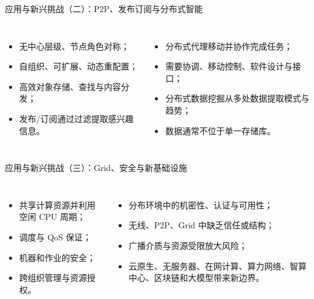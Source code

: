 \documentclass[UTF8,fontset=none,aspectratio=169,10pt]{beamer}
\begin{document}
\begin{frame}{应用与新兴挑战（二）：P2P、发布订阅与分布式智能}
\begin{columns}[T,onlytextwidth]
\begin{itemize}
  \item 无中心层级、节点角色对称；
  \item 自组织、可扩展、动态重配置；
  \item 高效对象存储、查找与内容分发；
  \item 发布/订阅通过过滤提取感兴趣信息。
\end{itemize}
\begin{itemize}
  \item 分布式代理移动并协作完成任务；
  \item 需要协调、移动控制、软件设计与接口；
  \item 分布式数据挖掘从多处数据提取模式与趋势；
  \item 数据通常不位于单一存储库。
\end{itemize}
\end{columns}
\end{frame}

\begin{frame}{应用与新兴挑战（三）：Grid、安全与新基础设施}
\begin{columns}[T,onlytextwidth]
\begin{itemize}
  \item 共享计算资源并利用空闲 CPU 周期；
  \item 调度与 QoS 保证；
  \item 机器和作业的安全；
  \item 跨组织管理与资源授权。
\end{itemize}
\begin{itemize}
  \item 分布环境中的机密性、认证与可用性；
  \item 无线、P2P、Grid 中缺乏信任或结构；
  \item 广播介质与资源受限放大风险；
  \item 云原生、无服务器、在网计算、算力网络、智算中心、区块链和大模型带来新边界。
\end{itemize}
\end{columns}
\end{frame}
\end{document}
